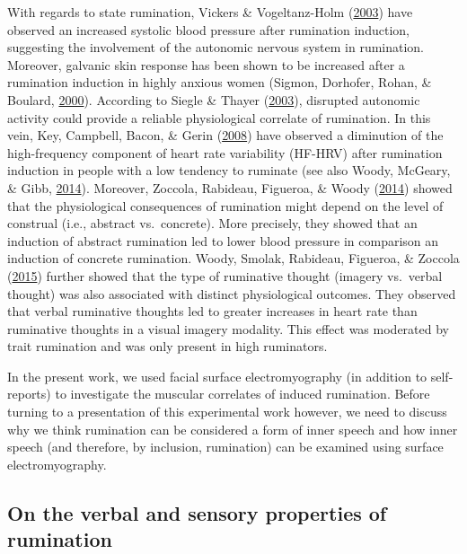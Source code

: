 \documentclass[a4paper,12pt,twoside,onecolumn,openright,final,oldfontcommands]{memoir}
\begin{document}
With regards to state rumination, Vickers \& Vogeltanz-Holm (\protect\hyperlink{ref-vickers_effects_2003}{2003}) have observed an increased systolic blood pressure after rumination induction, suggesting the involvement of the autonomic nervous system in rumination. Moreover, galvanic skin response has been shown to be increased after a rumination induction in highly anxious women (Sigmon, Dorhofer, Rohan, \& Boulard, \protect\hyperlink{ref-sigmon_impact_2000}{2000}). According to Siegle \& Thayer (\protect\hyperlink{ref-papageorgiou_physiological_2003}{2003}), disrupted autonomic activity could provide a reliable physiological correlate of rumination. In this vein, Key, Campbell, Bacon, \& Gerin (\protect\hyperlink{ref-Key2008}{2008}) have observed a diminution of the high-frequency component of heart rate variability (HF-HRV) after rumination induction in people with a low tendency to ruminate (see also Woody, McGeary, \& Gibb, \protect\hyperlink{ref-woody_brooding_2014}{2014}). Moreover, Zoccola, Rabideau, Figueroa, \& Woody (\protect\hyperlink{ref-zoccola_cardiovascular_2014}{2014}) showed that the physiological consequences of rumination might depend on the level of construal (i.e., abstract vs.~concrete). More precisely, they showed that an induction of abstract rumination led to lower blood pressure in comparison an induction of concrete rumination. Woody, Smolak, Rabideau, Figueroa, \& Zoccola (\protect\hyperlink{ref-woody_trait_2015}{2015}) further showed that the type of ruminative thought (imagery vs.~verbal thought) was also associated with distinct physiological outcomes. They observed that verbal ruminative thoughts led to greater increases in heart rate than ruminative thoughts in a visual imagery modality. This effect was moderated by trait rumination and was only present in high ruminators.

In the present work, we used facial surface electromyography (in addition to self-reports) to investigate the muscular correlates of induced rumination. Before turning to a presentation of this experimental work however, we need to discuss why we think rumination can be considered a form of inner speech and how inner speech (and therefore, by inclusion, rumination) can be examined using surface electromyography.

\hypertarget{on-the-verbal-and-sensory-properties-of-rumination}{%
\subsection{On the verbal and sensory properties of rumination}\label{on-the-verbal-and-sensory-properties-of-rumination}}
\end{document}

